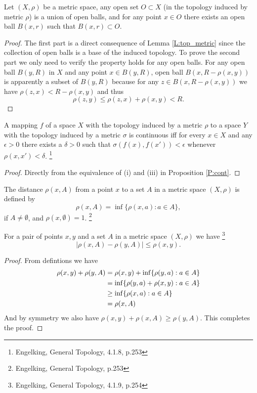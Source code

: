 \begin{proposition}
Let $(X,\rho)$ be a metric space, any open set $O\subset X$ (in the topology 
induced by metric $\rho$) is a union of open balls, and for any point $x\in O$ 
there exists an open ball $B(x,r)$ such that $B(x,r)\subset O$.
\end{proposition}
\begin{proof}
The first part is a direct consequence of Lemma \ref{L:top_metric} since the
collection of open balls is a base of the induced topology. 
To prove the second part we only need
to verify the property holds for any open balls. For any open ball $B(y,R)$ in
$X$ and any point $x\in B(y,R)$, open ball $B(x,R-\rho(x,y))$ is apparently a
subset of $B(y,R)$ because for any $z\in B(x,R-\rho(x,y))$ we have 
$\rho(z,x)<R-\rho(x,y)$ and thus
\[
  \rho(z,y) \leq \rho(z,x)+\rho(x,y) < R.
\]
\end{proof}


\begin{proposition} \label{P:cont2}
A mapping $f$ of a space $X$ with the topology induced by a metric $\rho$ to a
space $Y$ with the topology induced by a metric $\sigma$ is continuous iff for
every $x\in X$ and any $\epsilon>0$ there exists a $\delta>0$ such that 
$\sigma(f(x),f(x'))<\epsilon$ whenever $\rho(x,x')<\delta$.
\footnote{Engelking, General Topology, 4.1.8, p.253}
\end{proposition}
\begin{proof}
Directly from the equivalence of (i) and (iii) in Proposition \ref{P:cont}.
\end{proof}


\begin{definition}
The distance $\rho(x,A)$ from a point $x$ to a set $A$ in a metric space
$(X,\rho)$ is defined by
\[
  \rho(x,A)=\inf\{\rho(x,a): a\in A\}, 
\]
if $A\neq \emptyset$, and $\rho(x,\emptyset)=1$.
\footnote{Engelking, General Topology, p.253}
\end{definition}


\begin{proposition} \label{P:dist}
For a pair of points $x,y$ and a set $A$ in a metric space $(X,\rho)$ we have
\footnote{Engelking, General Topology, 4.1.9, p.254}
\[
  |\rho(x,A)-\rho(y,A)|\le \rho(x,y).
\]
\end{proposition}
\begin{proof}
From defintions we have
\begin{align*}
  \rho(x,y) + \rho(y,A) 
    &= \rho(x,y) + \inf\{\rho(y,a): a\in A\}  \notag \\
    &= \inf\{\rho(y,a)+\rho(x,y): a\in A\}  \notag \\
    &\ge \inf\{\rho(x,a): a\in A\}  \notag \\
    &= \rho(x,A) \notag \\
\end{align*}
And by symmetry we also have $\rho(x,y) + \rho(x,A)\ge\rho(y,A)$. 
This completes the proof.
\end{proof}

